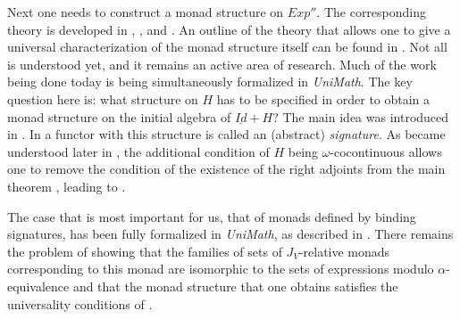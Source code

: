 \documentclass[12pt]{amsart}
\numberwithin{proposition}{subsection}
\newcommand{\uu}{\underline}
\begin{document}
Next one needs to construct a monad structure on $Exp''$. The corresponding
theory is developed in \cite{MatthesUustalu}, \cite{AM2016}, and
\cite{AMM2016}. An outline of the theory that allows one to give a universal
characterization of the monad structure itself can be found in
\cite{HM2012}. Not all is understood yet, and it remains an active area of
research. Much of the work being done today is being simultaneously
formalized in {\em UniMath}. The key question here is: what structure on $H$ has
to be specified in order to obtain a monad structure on the initial algebra of
$\uu{Id}+H$?  The main idea was introduced in \cite{MatthesUustalu}. In
\cite{AM2016} a functor with this structure is called an (abstract)
{\em signature}. As became understood later in \cite{AMM2016}, the additional
condition of $H$ being $\omega$-cocontinuous allows one to remove the condition
of the existence of the right adjoints from the main theorem \cite[Th. 15,
  p.~170]{MatthesUustalu}, leading to \cite[Th. 48]{AMM2016}.

The case that is most important for us, that of monads defined by
binding signatures, has been fully formalized in {\em UniMath}, as described
in \cite[{\tt BindingSigToMonad}]{AMM2016}. There remains the
problem of showing that the families of sets of $J_V$-relative monads
corresponding to this monad are isomorphic to the sets of expressions modulo
$\alpha$-equivalence and that the monad structure that one obtains
satisfies the universality conditions of \cite{HM2012}.

\end{document}
